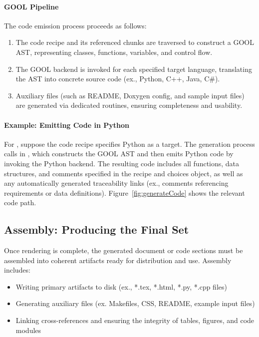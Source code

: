 \paragraph{GOOL Pipeline}
The code emission process proceeds as follows:
\begin{enumerate}
    \item The code recipe and its referenced chunks are traversed to construct 
    a GOOL AST, representing classes, functions, variables, and control flow.
    \item The GOOL backend is invoked for each specified target language, 
    translating the AST into concrete source code (ex., Python, C++, Java, 
    C\#).
    \item Auxiliary files (such as README, Doxygen config, and sample input 
    files) are generated via dedicated routines, ensuring completeness and 
    usability.
\end{enumerate}
\paragraph{Example: Emitting \gb{} Code in Python}
For \gb{}, suppose the code recipe specifies Python as a target. The 
generation process calls  in 
, which constructs the GOOL 
AST and then emits Python code by invoking the Python backend. The resulting 
code includes all functions, data structures, and comments specified in the 
recipe and choices object, as well as any automatically generated traceability 
links (ex., comments referencing requirements or data definitions). 
Figure~\ref{fig:generateCode} shows the relevant code path.


\subsection{Assembly: Producing the Final \SF{} Set}
Once rendering is complete, the generated document or code sections must be 
assembled into coherent artifacts ready for distribution and use. Assembly 
includes:
\begin{itemize}
    \item Writing primary artifacts to disk (ex., *.tex, *.html, *.py, *.cpp 
    files)
    \item Generating auxiliary files (ex. Makefiles, CSS, README, example input 
    files)
    \item Linking cross-references and ensuring the integrity of tables, 
    figures, and code modules
\end{itemize}

